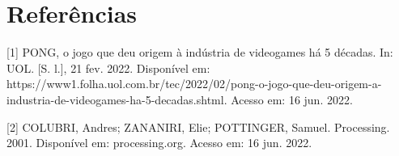 \documentclass[conference]{IEEEtran}
\begin{document}
\section*{Referências}

[1] PONG, o jogo que deu origem à indústria de videogames há 5 décadas. In: UOL. [S. l.], 21 fev. 2022. Disponível em: https://www1.folha.uol.com.br/tec/2022/02/pong-o-jogo-que-deu-origem-a-industria-de-videogames-ha-5-decadas.shtml. Acesso em: 16 jun. 2022.

[2] COLUBRI, Andres; ZANANIRI, Elie; POTTINGER, Samuel. Processing. 2001. Disponível em: processing.org. Acesso em: 16 jun. 2022.
\end{document}
